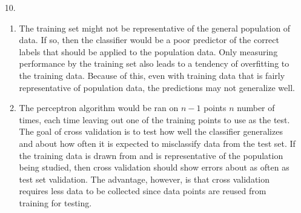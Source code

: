 \documentclass{article}
\begin{document}
\begin{enumerate}
\item[10.]
	\begin{enumerate}
	\item 
		  The training set might not be representative of the general population of data. If so, then the classifier would be a poor predictor of the correct labels that should be applied to the population data.
		  \newline\newline
		  Only measuring performance by the training set also leads to a tendency of overfitting to the training data. Because of this, even with training data that is fairly representative of population data, the predictions may not generalize well.
	\item 
		  The perceptron algorithm would be ran on $n-1$ points $n$ number of times, each time leaving out one of the training points to use as the test. The goal of cross validation is to test how well the classifier generalizes and about how often it is expected to misclassify data from the test set. If the training data is drawn from and is representative of the population being studied, then cross validation should show errors about as often as test set validation. The advantage, however, is that cross validation requires less data to be collected since data points are reused from training for testing. 
	\end{enumerate}

\end{enumerate}
\end{document}
